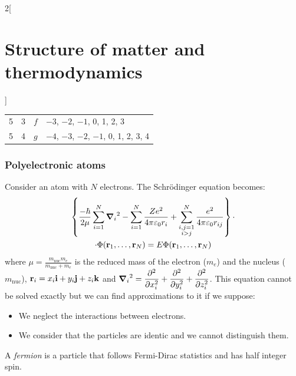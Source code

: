 \documentclass[../../../main.tex]{subfiles}
\begin{document}
\begin{multicols}{2}[\section{Structure of matter and thermodynamics}]
\begin{center}
\begin{minipage}{\linewidth}
\begin{tabular}{cccl}
                5   & 3      & $f$             & $-3$, $-2$, $-1$, 0, 1, 2, 3          \\
                5   & 4      & $g$             & $-4$, $-3$, $-2$, $-1$, 0, 1, 2, 3, 4 \\
                \hline
                \hline
            \end{tabular}
        \end{minipage}
    \end{center}
    \subsubsection{Polyelectronic atoms}
    \begin{prop}
        Consider an atom with $N$ electrons. The Schrödinger equation becomes:
        \begin{multline*}
            \left\{\frac{-\hbar}{2\mu}\sum_{i=1}^N{\grad_i}^2-\sum_{i=1}^N\frac{Ze^2}{4\pi\varepsilon_0r_i}+\sum_{\substack{i,j=1\\i>j}}^N\frac{e^2}{4\pi\varepsilon_0r_{ij}}\right\}\cdot\\\cdot\Phi(\boldsymbol{\mathrm{r}}_1,\ldots,\boldsymbol{\mathrm{r}}_N)=E\Phi(\boldsymbol{\mathrm{r}}_1,\ldots,\boldsymbol{\mathrm{r}}_N)
        \end{multline*}
        where $\displaystyle\mu=\frac{m_\text{nuc}m_e}{m_\text{nuc}+m_e}$ is the reduced mass of the electron ($m_e$) and the nucleus ($m_\text{nuc}$), $\boldsymbol{\mathrm{r}}_i=x_i\boldsymbol{\mathrm{i}}+y_i\boldsymbol{\mathrm{j}}+z_i\boldsymbol{\mathrm{k}}$ and $\displaystyle{\grad_i}^2=\pdv[2]{}{x_i}+\pdv[2]{}{y_i}+\pdv[2]{}{z_i}$.
        This equation cannot be solved exactly but we can find approximations to it if we suppose:
        \begin{itemize}
            \item We neglect the interactions between electrons.
            \item We consider that the particles are identic and we cannot distinguish them.
        \end{itemize}
    \end{prop}
    \begin{definition}[Fermions]
        A \textit{fermion} is a particle that follows Fermi-Dirac statistics and has half integer spin.
    \end{definition}
    \begin{definition}[Boson]

\end{definition}
\end{multicols}
\end{document}
